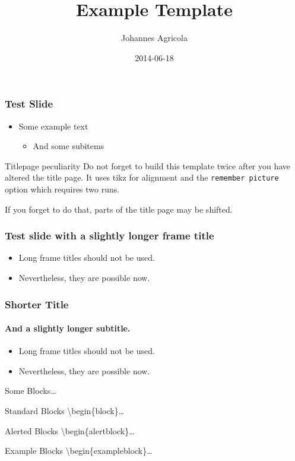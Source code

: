 \documentclass[10pt]{beamer}
\title{Example Template}
\date{2014-06-18}
\author[Johannes Agricola]{Johannes Agricola}
\begin{document}
\begin{frame}
  \titlepage
\end{frame}

\begin{frame}
  \frametitle{Test Slide}

  \begin{itemize}
    \item 
      Some example text
      \begin{itemize}
        \item 
          And some subitems
      \end{itemize}
  \end{itemize}

  \begin{alertblock}{Titlepage peculiarity}
    Do not forget to build this template twice after you have altered
    the title page. It uses tikz for alignment and the 
    \texttt{remember picture} option which requires two runs.

    If you forget to do that, parts of the title page may be shifted.
  \end{alertblock}
\end{frame}

\begin{frame}
  \frametitle{Test slide with a slightly longer frame title}

  \begin{itemize}
    \item 
      Long frame titles should not be used. 
    \item
      Nevertheless, they are possible now.
  \end{itemize}
\end{frame}
\begin{frame}
  \frametitle{Shorter Title}
  \framesubtitle{And a slightly longer subtitle.}

  \begin{itemize}
    \item 
      Long frame titles should not be used. 
    \item
      Nevertheless, they are possible now.
  \end{itemize}
\end{frame}

\begin{frame}{Some Blocks\ldots}
  \begin{block}{Standard Blocks}
    \textbackslash{}begin\{block\}\ldots
  \end{block}
  \begin{alertblock}{Alerted Blocks}
    \textbackslash{}begin\{alertblock\}\ldots
  \end{alertblock}
  \begin{exampleblock}{Example Blocks}
    \textbackslash{}begin\{exampleblock\}\ldots
  \end{exampleblock}
\end{frame}
\end{document}
